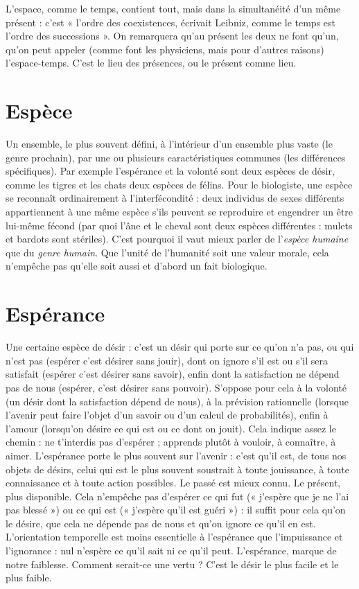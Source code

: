 L'espace, comme le temps, contient tout, mais dans la simultanéité d’un
même présent : c’est « l’ordre des coexistences, écrivait Leibniz, comme le
temps est l’ordre des successions ». On remarquera qu’au présent les deux ne
font qu’un, qu’on peut appeler (comme font les physiciens, mais pour d’autres
raisons) l’espace-temps. C’est le lieu des présences, ou le présent comme lieu.

\section{Espèce}
Un ensemble, le plus souvent défini, à l’intérieur d’un ensemble
plus vaste (le genre prochain), par une ou plusieurs caractéristiques
communes (les différences spécifiques). Par exemple l’espérance et la volonté
sont deux espèces de désir, comme les tigres et les chats deux espèces de félins.
Pour le biologiste, une espèce se reconnaît ordinairement à l’interfécondité :
deux individus de sexes différents appartiennent à une même espèce s’ils peuvent
se reproduire et engendrer un être lui-même fécond (par quoi l’âne et le
cheval sont deux espèces différentes : mulets et bardots sont stériles). C’est
pourquoi il vaut mieux parler de l'{\it espèce humaine} que du {\it genre humain}. Que
l'unité de l'humanité soit une valeur morale, cela n'empêche pas qu’elle soit
aussi et d’abord un fait biologique.

\section{Espérance}
Une certaine espèce de désir : c’est un désir qui porte sur ce
qu'on n’a pas, ou qui n’est pas (espérer c’est désirer sans
jouir), dont on ignore s’il est ou s’il sera satisfait (espérer c’est désirer sans
savoir), enfin dont la satisfaction ne dépend pas de nous (espérer, c’est désirer
sans pouvoir). S’oppose pour cela à la volonté (un désir dont la satisfaction
dépend de nous), à la prévision rationnelle (lorsque l’avenir peut faire l’objet
d’un savoir ou d’un calcul de probabilités), enfin à l’amour (lorsqu’on désire ce
qui est ou ce dont on jouit). Cela indique assez le chemin : ne t’interdis pas
d’espérer ; apprends plutôt à vouloir, à connaître, à aimer.
L’espérance porte le plus souvent sur l’avenir : c’est qu’il est, de tous nos
objets de désirs, celui qui est le plus souvent soustrait à toute jouissance, à toute
connaissance et à toute action possibles. Le passé est mieux connu. Le présent,
plus disponible. Cela n'empêche pas d’espérer ce qui fut (« j’espère que je ne
l'ai pas blessé ») ou ce qui est (« j'espère qu’il est guéri ») : il suffit pour cela
qu'on le désire, que cela ne dépende pas de nous et qu’on ignore ce qu’il en est.
L'orientation temporelle est moins essentielle à l’espérance que l'impuissance et
l'ignorance : nul n’espère ce qu’il sait ni ce qu’il peut. L’espérance, marque de
notre faiblesse. Comment serait-ce une vertu ? C’est le désir le plus facile et le
plus faible.

